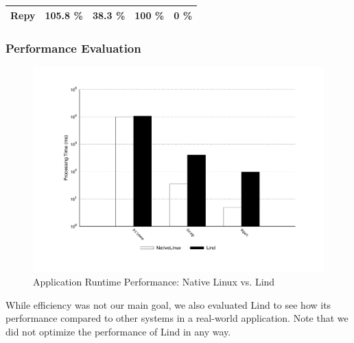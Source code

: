 {{\begin{table}
\begin{tabular}{|l|l|l|l|l|}
  Repy & 105.8 \% & 38.3 \% & 100 \%  & 0 \%  \\
  \hline
\end{tabular}
\label{table:trace-Repy}
\end{table}


\subsubsection{Performance Evaluation}
\label{Performance-Evaluation}

\begin{figure}
\centering
\includegraphics[width=1.0\columnwidth]{diagram/lind_oakland16_performance.pdf}
\caption{Application Runtime Performance: Native Linux vs. Lind}
\label{fig:performance_applications}
\end{figure}

While efficiency was not our main goal, we also evaluated Lind to see
how its performance compared to other systems in a real-world application.
Note that we did not optimize the performance of Lind in any way.

}}
